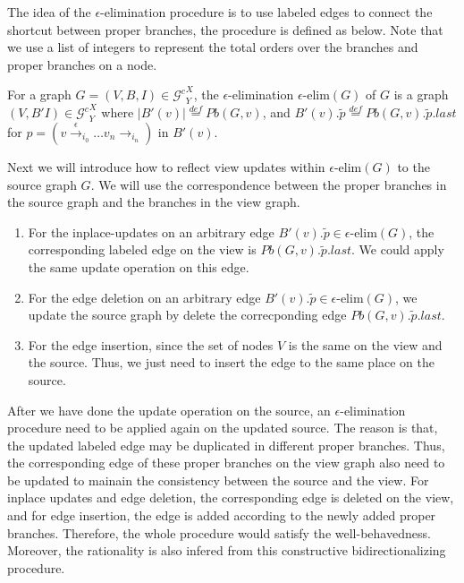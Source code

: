 \documentclass{llncs}
\newcommand{\act}[1]{{\xrightarrow{#1}{}}}
\newcommand{\Gc}{{\mathcal{G}^{c}}}
\begin{document}
The idea of the $\epsilon$-elimination procedure is to use labeled edges to connect the shortcut between proper branches, the procedure is defined as below. Note that we use a list of integers to represent the total orders over the branches and proper branches on a node.

\begin{definition}\label{def:epsilon}
For a graph $G=(V,B,I)\in\Gc^X_Y$, the $\epsilon$-elimination $\epsilon\mbox{-elim}(G)$ of $G$ is a graph $(V,B'I)\in\Gc^X_Y$ where $|B'(v)|\stackrel{def}{=}Pb(G,v)$, and $B'(v).\tilde{p}\stackrel{def}{=}Pb(G,v).\tilde{p}.last$ for $p=(v\act{\epsilon}_{i_0}\ldots v_n\act{}_{i_n})$ in $B'(v)$.
\end{definition}

Next we will introduce how to reflect view updates within $\epsilon\mbox{-elim}(G)$ to the source graph $G$. We will use the correspondence between the proper branches in the source graph and the branches in the view graph.

\begin{enumerate}
	\item For the inplace-updates on an arbitrary edge $B'(v).\tilde{p}\in\epsilon\mbox{-elim}(G)$, the corresponding labeled edge on the view is $Pb(G,v).\tilde{p}.last$. We could apply the same update operation on this edge. 
	\item For the edge deletion on an arbitrary edge $B'(v).\tilde{p}\in\epsilon\mbox{-elim}(G)$, we update the source graph by delete the correcponding edge $Pb(G,v).\tilde{p}.last$.
	\item For the edge insertion, since the set of nodes $V$ is the same on the view and the source. Thus, we just need to insert the edge to the same place on the source.
\end{enumerate}

After we have done the update operation on the source, an $\epsilon$-elimination procedure need to be applied again on the updated source. The reason is that, the updated labeled edge may be duplicated in different proper branches. Thus, the corresponding edge of these proper branches on the view graph also need to be updated to mainain the consistency between the source and the view. For inplace updates and edge deletion, the corresponding edge is deleted on the view, and for edge insertion, the edge is added according to the newly added proper branches. Therefore, the whole procedure would satisfy the well-behavedness. Moreover, the rationality is also infered from this constructive bidirectionalizing procedure.
\end{document}
